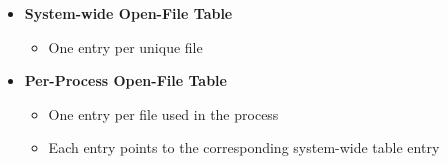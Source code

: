 \documentclass[8pt,twocolumn]{article}
\begin{document}
\begin{itemize}
  \setlength{\itemsep}{0pt} %
  \setlength{\parskip}{0pt}\vspace{-0.6em}
  \item \textbf{System-wide Open-File Table}\vspace{-0.6em}
  \begin{itemize}
    \setlength{\itemsep}{0pt} %
    \setlength{\parskip}{0pt}
      \item One entry per unique file
  \end{itemize}\vspace{-0.6em}
  \item \textbf{Per-Process Open-File Table}\vspace{-0.6em}
  \begin{itemize}
    \setlength{\itemsep}{0pt} %
    \setlength{\parskip}{0pt}
      \item One entry per file used in the process
      \item Each entry points to the corresponding system-wide table entry
  \end{itemize}\vspace{-0.6em}
\end{itemize}\vspace{-0.6em}
\noindent{}
\noindent{}
\end{document}
